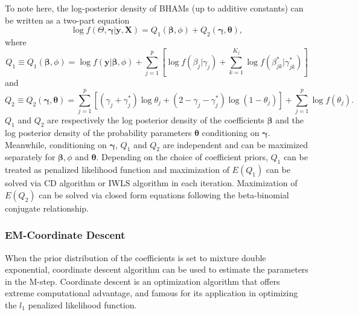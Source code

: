 \documentclass[AMA,STIX1COL,]{WileyNJD-v2}
\begin{document}
To note here, the log-posterior density of BHAMs (up to additive
constants) can be written as a two-part equation
\[ \log f(\Theta, \boldsymbol{\gamma}| \textbf{y}, \textbf{X}) = Q_1(\boldsymbol{\beta}, \phi) + Q_2 (\boldsymbol{\gamma},\boldsymbol{\theta}),\]
where
\[ Q_1\equiv Q_1(\boldsymbol{\beta}, \phi) = \log f(\textbf{y}|\boldsymbol{\beta}, \phi) + \sum\limits_{j=1}^p\left[\log f(\beta_j|\gamma_j)+\sum\limits_{k=1}^{K_j} \log f(\beta^{*}_{jk}|\gamma^{*}_{jk})\right]\]
and
\[Q_2 \equiv Q_2(\boldsymbol{\gamma},\boldsymbol{\theta}) = \sum\limits_{j=1}^{p} \left[ (\gamma_j+\gamma_{j}^{*})\log \theta_j + (2-\gamma_j-\gamma_{j}^{*}) \log (1-\theta_j)\right] +  \sum\limits_{j=1}^{p}\log f(\theta_j).\]
\(Q_1\) and \(Q_2\) are respectively the log posterior density of the
coefficients \(\boldsymbol{\beta}\) and the log posterior density of the
probability parameters \(\boldsymbol{\theta}\) conditioning on
\(\boldsymbol{\gamma}\). Meanwhile, conditioning on
\(\boldsymbol{\gamma}\), \(Q_1\) and \(Q_2\) are independent and can be
maximized separately for \(\boldsymbol{\beta}, \phi\) and
\(\boldsymbol{\theta}\). Depending on the choice of coefficient priors,
\(Q_1\) can be treated as penalized likelihood function and maximization
of \(E(Q_1)\) can be solved via CD algorithm or IWLS algorithm in each
iteration. Maximization of \(E(Q_2)\) can be solved via closed form
equations following the beta-binomial conjugate relationship.

\subsubsection{EM-Coordinate Descent}
\label{sec:EMCD}

When the prior distribution of the coefficients is set to mixture double
exponential, coordinate descent algorithm can be used to estimate the
parameters in the M-step. Coordinate descent is an optimization
algorithm that offers extreme computational advantage, and famous for
its application in optimizing the \(l_1\) penalized likelihood function.
\end{document}
